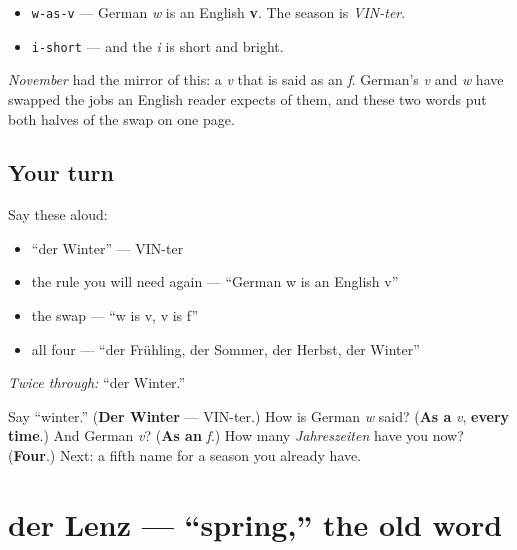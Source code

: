 \begin{sounds}
\begin{itemize}
\raggedright
  \item \texttt{w-as-v} — German \emph{w} is an English \textbf{v}. The season is \emph{VIN-ter}.
  \item \texttt{i-short} — and the \emph{i} is short and bright.
\end{itemize}

\emph{November} had the mirror of this: a \emph{v} that is said as an \emph{f}. German's \emph{v} and \emph{w} have swapped the jobs an English reader expects of them, and these two words put both halves of the swap on one page.
\end{sounds}

\subsection*{Your turn}
Say these aloud:

\begin{itemize}
\raggedright
  \item \textquotedblleft{}der Winter\textquotedblright{} — VIN-ter
  \item the rule you will need again — \textquotedblleft{}German w is an English v\textquotedblright{}
  \item the swap — \textquotedblleft{}w is v, v is f\textquotedblright{}
  \item all four — \textquotedblleft{}der Frühling, der Sommer, der Herbst, der Winter\textquotedblright{}
\end{itemize}

\emph{Twice through:} \textquotedblleft{}der Winter.\textquotedblright{}

\begin{tcolorbox}[breakable,colback=teal!4,colframe=teal!35!black,title={Before you move on}]
Say \textquotedblleft{}winter.\textquotedblright{} (\textbf{Der Winter} — VIN-ter.) How is German \emph{w} said? (\textbf{As a} \emph{v}, \textbf{every time}.) And German \emph{v}? (\textbf{As an} \emph{f}.) How many \emph{Jahreszeiten} have you now? (\textbf{Four}.) Next: a fifth name for a season you already have.
\end{tcolorbox}
\section[der Lenz]{der Lenz — \textquotedblleft{}spring,\textquotedblright{} the old word}

